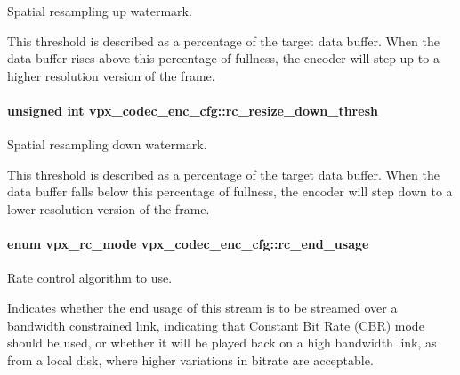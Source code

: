 Spatial resampling up watermark. 

This threshold is described as a percentage of the target data buffer. When the data buffer rises above this percentage of fullness, the encoder will step up to a higher resolution version of the frame. 
\paragraph[{\texorpdfstring{rc\+\_\+resize\+\_\+down\+\_\+thresh}{rc_resize_down_thresh}}]{\setlength{\rightskip}{0pt plus 5cm}unsigned int vpx\+\_\+codec\+\_\+enc\+\_\+cfg\+::rc\+\_\+resize\+\_\+down\+\_\+thresh}\hypertarget{structvpx__codec__enc__cfg_a1be7bd7b0eaf1e99b5e4028c37c65488}{}\label{structvpx__codec__enc__cfg_a1be7bd7b0eaf1e99b5e4028c37c65488}


Spatial resampling down watermark. 

This threshold is described as a percentage of the target data buffer. When the data buffer falls below this percentage of fullness, the encoder will step down to a lower resolution version of the frame. 
\paragraph[{\texorpdfstring{rc\+\_\+end\+\_\+usage}{rc_end_usage}}]{\setlength{\rightskip}{0pt plus 5cm}enum {\bf vpx\+\_\+rc\+\_\+mode} vpx\+\_\+codec\+\_\+enc\+\_\+cfg\+::rc\+\_\+end\+\_\+usage}\hypertarget{structvpx__codec__enc__cfg_a99c415edb6c6f909a095a57c3430a116}{}\label{structvpx__codec__enc__cfg_a99c415edb6c6f909a095a57c3430a116}


Rate control algorithm to use. 

Indicates whether the end usage of this stream is to be streamed over a bandwidth constrained link, indicating that Constant Bit Rate (C\+BR) mode should be used, or whether it will be played back on a high bandwidth link, as from a local disk, where higher variations in bitrate are acceptable. 

